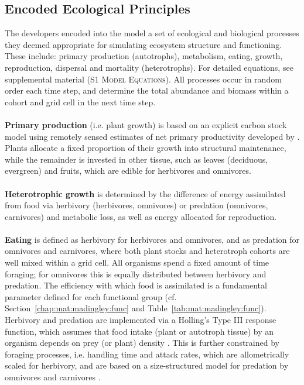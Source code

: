 \subsection{Encoded Ecological Principles}
\label{chap:mat:madingley:princip}
The developers encoded into the model a set of ecological and biological processes they deemed appropriate for simulating ecosystem structure and functioning. These include: primary production (autotrophs), metabolism, eating, growth, reproduction, dispersal and mortality (heterotrophs). For detailed equations, see supplemental material (S1 \textsc{Model Equations}). All processes occur in random order each time step, and determine the total abundance and biomass within a cohort and grid cell in the next time step. \\\\
\textbf{Primary production} (i.e. plant growth) is based on an explicit carbon stock model using remotely sensed estimates of net primary productivity developed by \cite{Smith2012}. 
Plants allocate a fixed proportion of their growth into structural maintenance, while the remainder is invested in other tissue, such as leaves (deciduous, evergreen) and fruits, which are edible for herbivores and omnivores. 
\\\\
\textbf{Heterotrophic growth} is determined by the difference of energy assimilated from food via herbivory (herbivores, omnivores) or predation (omnivores, carnivores) and metabolic loss, as well as energy allocated for reproduction.\\\\
\textbf{Eating} is defined as herbivory for herbivores and omnivores, and as predation for omnivores and carnivores, where both plant stocks and heterotroph cohorts are well mixed within a grid cell. All organisms spend a fixed amount of time foraging; for omnivores this is equally distributed between herbivory and predation. 
The efficiency with which food is assimilated is a fundamental parameter defined for each functional group (cf. Section~\ref{chap:mat:madingley:func} and Table~\ref{tab:mat:madingley:func}). \\
Herbivory and predation are implemented via a Holling's Type III response function, which assumes that food intake (plant or autotroph tissue) by an organism depends on prey (or plant) density \citep{Denno2012}. 
This is further constrained by foraging processes, i.e. handling time and attack rates, which are allometrically scaled for herbivory, and are based on a size-structured model for predation by omnivores and carnivores \citep[after][; cf. supplemental material for details]{Williams2011}. 
